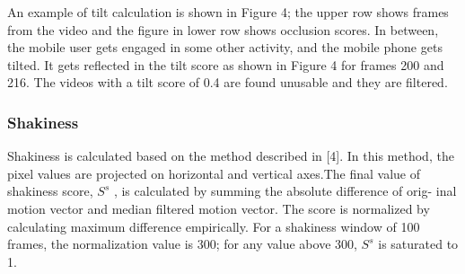 \documentclass{sig-alternate-05-2015}
\begin{document}
\begin{itemize}
An example of tilt calculation is shown in Figure 4; the upper
row shows frames from the video and the figure in lower row shows
occlusion scores. In between, the mobile user gets engaged in some other
activity, and the mobile phone gets tilted. It gets reflected in the
tilt score as shown in Figure 4 for frames 200 and 216. The videos
with a tilt score of 0.4 are found unusable and they are filtered.
\subsubsection{Shakiness}
Shakiness is calculated based on the method described in [4].
In this method, the pixel values are projected on horizontal and
vertical axes.The final value of shakiness
score, $S^s$ , is calculated by summing the absolute difference of orig-
inal motion vector and median filtered motion vector. The score is
normalized by calculating maximum difference empirically. For a
shakiness window of 100 frames, the normalization value is 300;
for any value above 300, $S^s$ is saturated to 1.

\end{itemize}
\end{document}
